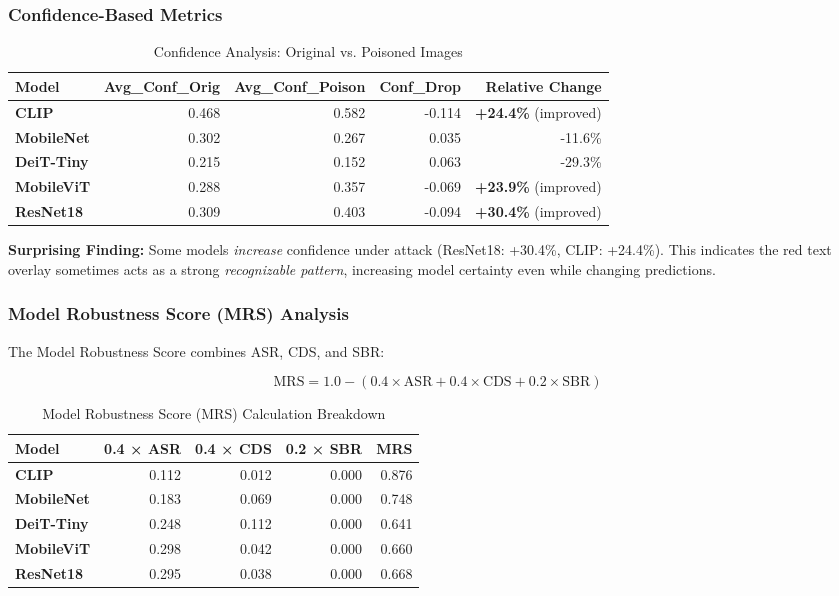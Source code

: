 \documentclass[11pt]{article}
\begin{document}
\subsubsection{Confidence-Based Metrics}

\begin{table}[H]
\centering
\small
\caption{Confidence Analysis: Original vs. Poisoned Images}
\label{tab:confidence_analysis}
\begin{tabular}{|l|r|r|r|r|}
\hline
\textbf{Model} & \textbf{Avg\_Conf\_Orig} & \textbf{Avg\_Conf\_Poison} & \textbf{Conf\_Drop} & \textbf{Relative Change} \\
\hline
\textbf{CLIP} & 0.468 & 0.582 & -0.114 & \textbf{+24.4\%} (improved) \\
\hline
\textbf{MobileNet} & 0.302 & 0.267 & 0.035 & -11.6\% \\
\hline
\textbf{DeiT-Tiny} & 0.215 & 0.152 & 0.063 & -29.3\% \\
\hline
\textbf{MobileViT} & 0.288 & 0.357 & -0.069 & \textbf{+23.9\%} (improved) \\
\hline
\textbf{ResNet18} & 0.309 & 0.403 & -0.094 & \textbf{+30.4\%} (improved) \\
\hline
\end{tabular}
\end{table}

\textbf{Surprising Finding:} Some models \emph{increase} confidence under attack (ResNet18: +30.4\%, CLIP: +24.4\%). This indicates the red text overlay sometimes acts as a strong \emph{recognizable pattern}, increasing model certainty even while changing predictions.

\subsubsection{Model Robustness Score (MRS) Analysis}

The Model Robustness Score combines ASR, CDS, and SBR:

\[
\text{MRS} = 1.0 - (0.4 \times \text{ASR} + 0.4 \times \text{CDS} + 0.2 \times \text{SBR})
\]

\begin{table}[H]
\centering
\small
\caption{Model Robustness Score (MRS) Calculation Breakdown}
\label{tab:mrs_breakdown}
\begin{tabular}{|l|r|r|r|r|}
\hline
\textbf{Model} & \textbf{0.4 × ASR} & \textbf{0.4 × CDS} & \textbf{0.2 × SBR} & \textbf{MRS} \\
\hline
\textbf{CLIP} & 0.112 & 0.012 & 0.000 & 0.876 \\
\hline
\textbf{MobileNet} & 0.183 & 0.069 & 0.000 & 0.748 \\
\hline
\textbf{DeiT-Tiny} & 0.248 & 0.112 & 0.000 & 0.641 \\
\hline
\textbf{MobileViT} & 0.298 & 0.042 & 0.000 & 0.660 \\
\hline
\textbf{ResNet18} & 0.295 & 0.038 & 0.000 & 0.668 \\
\hline
\end{tabular}
\end{table}
\end{document}

